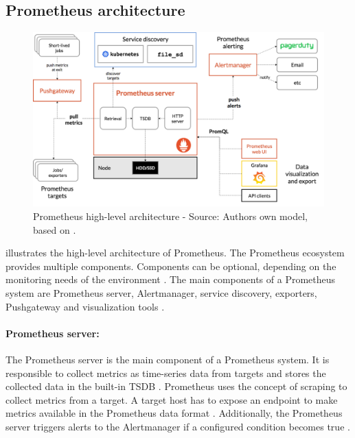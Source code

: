 \subsection{Prometheus architecture}


\begin{figure}[h]%
\centering
\includegraphics[scale=0.25]{images/03_background/prom_architecture}%
\caption{Prometheus high-level architecture - Source: Authors own model, based on \cite{Prom2020Docs, Bastos2019Prom}.}%
\label{fig:prom_architecture}%
\end{figure}

 illustrates the high-level architecture of Prometheus.
The Prometheus ecosystem provides multiple components. Components can be optional, depending on the monitoring needs of the environment \cite{Bastos2019Prom}. The main components of a Prometheus system are Prometheus server, Alertmanager, service discovery, exporters, Pushgateway and visualization tools \cite{Prom2020Docs}.


\paragraph{Prometheus server:} 
The Prometheus server is the main component of a Prometheus system. It is responsible to collect metrics as time-series data from targets and stores the collected data in the built-in TSDB \cite{Bastos2019Prom}. Prometheus uses the concept of scraping to collect metrics from a target. A target host has to expose an endpoint to make metrics available in the Prometheus data format \cite{Pandey2020Monitoring}. Additionally, the Prometheus server triggers alerts to the Alertmanager if a configured condition becomes true \cite{Prom2020Docs}.


